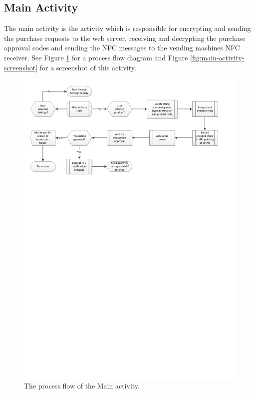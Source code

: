 \subsection{Main Activity}

The main activity is the activity which is responsible for encrypting and
sending the purchase requests to the web server, receiving and decrypting
the purchase approval codes and sending the NFC messages to the vending machines
NFC receiver. See Figure \ref{fig:main-activity} for a process flow diagram
and Figure \ref{fig:main-activity-screenshot} for a screenshot of this activity.

\begin{figure}
 \centering 
 \includegraphics[clip = true, trim = 0 570 0 20,
 scale=0.7]{app_main_processflow}
 \caption{The process flow of the Main activity.}
 \label{fig:main-activity}
\end{figure}

